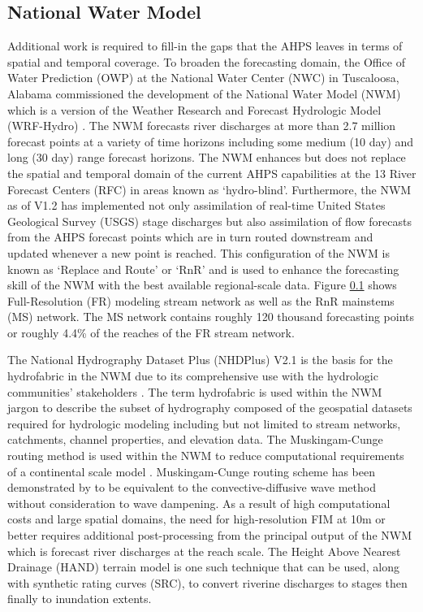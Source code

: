 \subsection{National Water Model}
\label{ssec:national_water_model}
%
Additional work is required to fill-in the gaps that the AHPS leaves in terms of spatial and temporal coverage.
To broaden the forecasting domain, the Office of Water Prediction (OWP) at the National Water Center (NWC) in Tuscaloosa, Alabama commissioned the development of the National Water Model (NWM) which is a version of the Weather Research and Forecast Hydrologic Model (WRF-Hydro) \cite{gochis2018wrf,cosgrove2019evolution}. 
The NWM forecasts river discharges at more than 2.7 million forecast points at a variety of time horizons including some medium (10 day) and long (30 day) range forecast horizons.
The NWM enhances but does not replace the spatial and temporal domain of the current AHPS capabilities at the 13 River Forecast Centers (RFC) in areas known as `hydro-blind'. 
Furthermore, the NWM as of V1.2 has implemented not only assimilation of real-time United States Geological Survey (USGS) stage discharges but also assimilation of flow forecasts from the AHPS forecast points which are in turn routed downstream and updated whenever a new point is reached. 
This configuration of the NWM is known as `Replace and Route' or `RnR' and is used to enhance the forecasting skill of the NWM with the best available regional-scale data.
Figure \ref{ssec:national_water_model} shows Full-Resolution (FR) modeling stream network as well as the RnR mainstems (MS) network.
The MS network contains roughly 120 thousand forecasting points or roughly 4.4\% of the reaches of the FR stream network.

The National Hydrography Dataset Plus (NHDPlus) V2.1 is the basis for the hydrofabric in the NWM due to its comprehensive use with the hydrologic communities' stakeholders \cite{mckay2012nhdplus}. 
The term hydrofabric is used within the NWM jargon to describe the subset of hydrography composed of the geospatial datasets required for hydrologic modeling including but not limited to stream networks, catchments, channel properties, and elevation data. 
The Muskingam-Cunge routing method is used within the NWM to reduce computational requirements of a continental scale model \cite{bedient2008hydrology,ponce1994variable,gochis2018wrf}.
Muskingam-Cunge routing scheme has been demonstrated by  to be equivalent to the convective-diffusive wave method without consideration to wave dampening.
As a result of high computational costs and large spatial domains, the need for high-resolution FIM at 10m or better requires additional post-processing from the principal output of the NWM which is forecast river discharges at the reach scale. The Height Above Nearest Drainage (HAND) terrain model is one such technique that can be used, along with synthetic rating curves (SRC), to convert riverine discharges to stages then finally to inundation extents.
%
